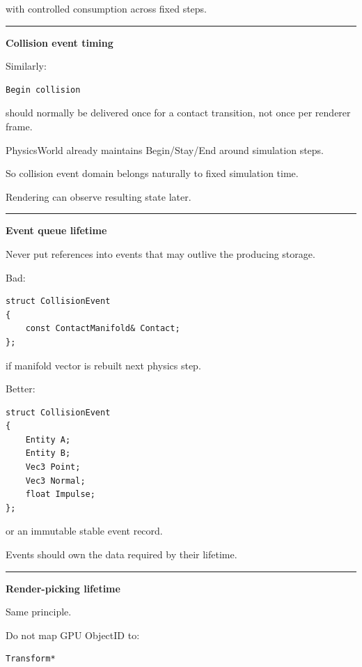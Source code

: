 with controlled consumption across fixed steps.

\begin{center}\rule{0.5\linewidth}{0.5pt}\end{center}

\textbf{Collision event timing}

Similarly:

\begin{verbatim}
Begin collision
\end{verbatim}

should normally be delivered once for a contact transition, not once per renderer frame.

PhysicsWorld already maintains Begin/Stay/End around simulation steps.

So collision event domain belongs naturally to fixed simulation time.

Rendering can observe resulting state later.

\begin{center}\rule{0.5\linewidth}{0.5pt}\end{center}

\textbf{Event queue lifetime}

Never put references into events that may outlive the producing storage.

Bad:

\begin{verbatim}
struct CollisionEvent
{
    const ContactManifold& Contact;
};
\end{verbatim}

if manifold vector is rebuilt next physics step.

Better:

\begin{verbatim}
struct CollisionEvent
{
    Entity A;
    Entity B;
    Vec3 Point;
    Vec3 Normal;
    float Impulse;
};
\end{verbatim}

or an immutable stable event record.

Events should own the data required by their lifetime.

\begin{center}\rule{0.5\linewidth}{0.5pt}\end{center}

\textbf{Render-picking lifetime}

Same principle.

Do not map GPU ObjectID to:

\begin{verbatim}
Transform*
\end{verbatim}

